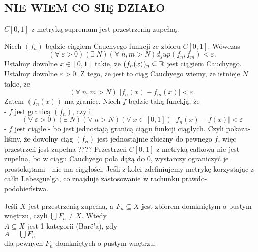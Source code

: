 \subsection{NIE WIEM CO SIĘ DZIAŁO}
\begin{center}\large
    $C[0, 1]$ z metryką supremum jest przestrzenią zupełną.
\end{center}
\dowod
Niech $(f_n)$ będzie ciągiem Cauchyego funkcji ze zbioru $C[0, 1]$. Wówczas
$$(\forall\;\varepsilon>0)(\exists\;N)(\forall\;n, m>N)d_sup(f_n, f_m)<\varepsilon.$$
Ustalmy dowolne $x\in[0,1]$ takie, że $(f_n(x))_n\subseteq \mathbb{R}$ jest ciągiem Cauchyego. Ustalmy dowolne $\varepsilon>0$. Z tego, że jest to ciąg Cauchyego wiemy, że istnieje $N$ takie, że
$$(\forall\;n, m>N)\;|f_n(x)-f_m(x)|<\varepsilon.$$
Zatem $(f_n(x))$ ma granicę. Niech $f$ będzie taką funckją, że\smallskip\\
\indent - $f$ jest granicą $(f_n)$, czyli
$$(\forall\;\varepsilon>0)(\exists\;N)(\forall\;n>N)(\forall\;x\in[0, 1])\;|f_n(x)-f(x)|<\varepsilon$$
\indent - $f$ jest ciągłe - bo jest jednostają granicą ciągu funkcji ciągłych.
Czyli pokaza-\\liśmy, że dowolny ciąg $(f_n)$ jest jednostajnie zbieżny do pewnego $f$, więc przestrzeń jest zupełna {\color{cyan}????}
\kondow
Przestrzeń $C[0, 1]$ z metryką całkową nie jest zupełna, bo w ciągu Cauchyego pola dążą do 0, wystarczy ograniczyć je prostokątami - nie ma ciągłości. Jeśli z kolei zdefiniujemy metrykę korzystając z {\color{acc}całki Lebesgue'ga}, co znajduje zastosowanie w rachunku prawdo-\\podobieństwa.\bigskip\\
\bigskip
\begin{center}\large
    Jeśli $X$ jest przestrzenią zupełną, a $F_n\subseteq X$ jest zbiorem domkniętym o pustym wnętrzu, czyli $\bigcup F_n\neq X$. Wtedy\smallskip\\
    {\color{def}$A\subseteq X$ jest 1 kategorii} (Bar{\"e}'a), gdy\smallskip\\
    $A=\bigcup F_n$\smallskip\\
    dla pewnych $F_n$ domkniętych o pustym wnętrzu.
\end{center}

